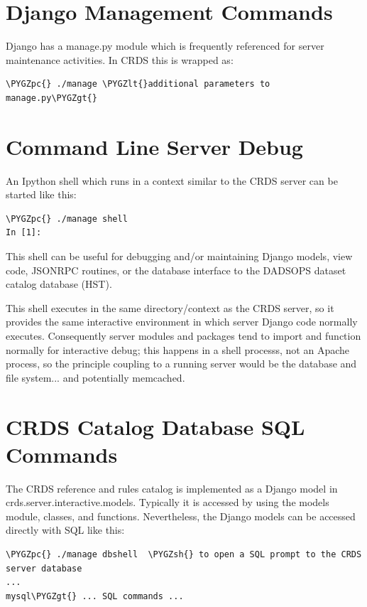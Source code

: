 \documentclass[letterpaper,10pt,english]{sphinxmanual}
\def\PYGZlt{\char`\<}
\def\PYGZgt{\char`\>}
\def\PYGZsh{\char`\#}
\def\PYGZpc{\char`\%}
\begin{document}
\section{Django Management Commands}
\label{server_guide:django-management-commands}
Django has a manage.py module which is frequently referenced for server maintenance activities.   In CRDS this is
wrapped as:

\begin{Verbatim}[commandchars=\\\{\}]
\PYGZpc{} ./manage \PYGZlt{}additional parameters to manage.py\PYGZgt{}
\end{Verbatim}


\section{Command Line Server Debug}
\label{server_guide:command-line-server-debug}
An Ipython shell which runs in a context similar to the CRDS server can be started like this:

\begin{Verbatim}[commandchars=\\\{\}]
\PYGZpc{} ./manage shell
In [1]:
\end{Verbatim}

This shell can be useful for debugging and/or maintaining Django models, view code, JSONRPC routines, or
the database interface to the DADSOPS dataset catalog database (HST).

This shell executes in the same directory/context as the CRDS server,  so it provides the same interactive
environment in which server Django code normally executes.   Consequently server modules and packages tend to
import and function normally for interactive debug;  this happens in a shell processs,  not an Apache process,
so the principle coupling to a running server would be the database and file system... and potentially memcached.


\section{CRDS Catalog Database SQL Commands}
\label{server_guide:crds-catalog-database-sql-commands}
The CRDS reference and rules catalog is implemented as a Django model in crds.server.interactive.models.  Typically
it is accessed by using the models module, classes, and functions.  Nevertheless,  the Django models can be accessed
directly with SQL like this:

\begin{Verbatim}[commandchars=\\\{\}]
\PYGZpc{} ./manage dbshell  \PYGZsh{} to open a SQL prompt to the CRDS server database
...
mysql\PYGZgt{} ... SQL commands ...
\end{Verbatim}
\end{document}
